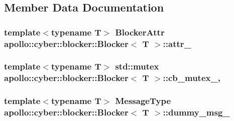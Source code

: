 \subsection{Member Data Documentation}
\hypertarget{classapollo_1_1cyber_1_1blocker_1_1Blocker_a31770fde4b92797a07af4f3eadb824ff}{
\subsubsection[{attr\-\_\-}]{\setlength{\rightskip}{0pt plus 5cm}template$<$typename T$>$ {\bf Blocker\-Attr} {\bf apollo\-::cyber\-::blocker\-::\-Blocker}$<$ T $>$\-::attr\-\_\-\hspace{0.3cm}{\ttfamily [private]}}}\label{classapollo_1_1cyber_1_1blocker_1_1Blocker_a31770fde4b92797a07af4f3eadb824ff}
\hypertarget{classapollo_1_1cyber_1_1blocker_1_1Blocker_aef42b424d6fe0416c40d3ea5110cbc7f}{
\subsubsection[{cb\-\_\-mutex\-\_\-}]{\setlength{\rightskip}{0pt plus 5cm}template$<$typename T$>$ std\-::mutex {\bf apollo\-::cyber\-::blocker\-::\-Blocker}$<$ T $>$\-::cb\-\_\-mutex\-\_\-\hspace{0.3cm}{\ttfamily [mutable]}, {\ttfamily [private]}}}\label{classapollo_1_1cyber_1_1blocker_1_1Blocker_aef42b424d6fe0416c40d3ea5110cbc7f}
\hypertarget{classapollo_1_1cyber_1_1blocker_1_1Blocker_a0b66558da5f459f983f120203583e613}{
\subsubsection[{dummy\-\_\-msg\-\_\-}]{\setlength{\rightskip}{0pt plus 5cm}template$<$typename T$>$ {\bf Message\-Type} {\bf apollo\-::cyber\-::blocker\-::\-Blocker}$<$ T $>$\-::dummy\-\_\-msg\-\_\-\hspace{0.3cm}{\ttfamily [private]}}}\label{classapollo_1_1cyber_1_1blocker_1_1Blocker_a0b66558da5f459f983f120203583e613}
